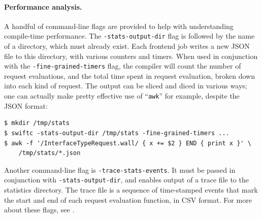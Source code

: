 \documentclass[../generics]{subfiles}
\begin{document}
\paragraph{Performance analysis.} A handful of command-line flags are provided to help with understanding compile-time performance. The \texttt{-stats-output-dir} flag is followed by the name of a directory, which must already exist. Each frontend job writes a new JSON file to this directory, with various counters and timers. When used in conjunction with the \texttt{-fine-grained-timers} flag, the compiler will count the number of request evaluations, and the total time spent in request evaluation, broken down into each kind of request. The output can be sliced and diced in various ways; one can actually make pretty effective use of ``\texttt{awk}'' \cite{awk} for example, despite the JSON format:
\begin{Verbatim}
$ mkdir /tmp/stats
$ swiftc -stats-output-dir /tmp/stats -fine-grained-timers ...
$ awk -f '/InterfaceTypeRequest.wall/ { x += $2 } END { print x }' \
    /tmp/stats/*.json
\end{Verbatim}
Another command-line flag is \texttt{-trace-stats-events}. It must be passed in conjunction with \texttt{-stats-output-dir}, and enables output of a trace file to the statistics directory. The trace file is a sequence of time-stamped events that mark the start and end of each request evaluation function, in CSV format. For more about these flags, see \cite{compileperf}.
\end{document}
